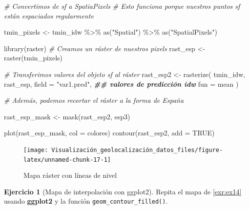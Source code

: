 \documentclass[
]{book}
\newenvironment{Shaded}{\begin{snugshade}}{\end{snugshade}}
\newcommand{\AttributeTok}[1]{\textcolor[rgb]{0.77,0.63,0.00}{#1}}
\newcommand{\CommentTok}[1]{\textcolor[rgb]{0.56,0.35,0.01}{\textit{#1}}}
\newcommand{\ConstantTok}[1]{\textcolor[rgb]{0.00,0.00,0.00}{#1}}
\newcommand{\DocumentationTok}[1]{\textcolor[rgb]{0.56,0.35,0.01}{\textbf{\textit{#1}}}}
\newcommand{\FunctionTok}[1]{\textcolor[rgb]{0.00,0.00,0.00}{#1}}
\newcommand{\NormalTok}[1]{#1}
\newcommand{\OtherTok}[1]{\textcolor[rgb]{0.56,0.35,0.01}{#1}}
\newcommand{\SpecialCharTok}[1]{\textcolor[rgb]{0.00,0.00,0.00}{#1}}
\newcommand{\StringTok}[1]{\textcolor[rgb]{0.31,0.60,0.02}{#1}}
\theoremstyle{definition}
\theoremstyle{definition}
\theoremstyle{definition}
\newtheorem{exercise}{Ejercicio}[chapter]
\theoremstyle{definition}
\theoremstyle{remark}
\begin{document}
\begin{Shaded}
\begin{Highlighting}[]
\CommentTok{\# Convertimos de sf a SpatiaPixels}
\CommentTok{\# Esto funciona porque nuestros puntos sf están espaciados regularmente}

\NormalTok{tmin\_pixels }\OtherTok{\textless{}{-}}\NormalTok{ tmin\_idw }\SpecialCharTok{\%\textgreater{}\%}
  \FunctionTok{as}\NormalTok{(}\StringTok{"Spatial"}\NormalTok{) }\SpecialCharTok{\%\textgreater{}\%}
  \FunctionTok{as}\NormalTok{(}\StringTok{"SpatialPixels"}\NormalTok{)}


\FunctionTok{library}\NormalTok{(raster)}
\CommentTok{\# Creamos un ráster de nuestros pixels}
\NormalTok{rast\_esp }\OtherTok{\textless{}{-}} \FunctionTok{raster}\NormalTok{(tmin\_pixels)}

\CommentTok{\# Transferimos valores del objeto sf al ráster}
\NormalTok{rast\_esp2 }\OtherTok{\textless{}{-}} \FunctionTok{rasterize}\NormalTok{(}
\NormalTok{  tmin\_idw,}
\NormalTok{  rast\_esp,}
  \AttributeTok{field =} \StringTok{"var1.pred"}\NormalTok{, }\DocumentationTok{\#\# valores de predicción idw}
  \AttributeTok{fun =}\NormalTok{ mean}
\NormalTok{)}

\CommentTok{\# Además, podemos recortar el ráster a la forma de España}

\NormalTok{rast\_esp\_mask }\OtherTok{\textless{}{-}} \FunctionTok{mask}\NormalTok{(rast\_esp2, esp3)}

\FunctionTok{plot}\NormalTok{(rast\_esp\_mask, }\AttributeTok{col =}\NormalTok{ colores)}
\FunctionTok{contour}\NormalTok{(rast\_esp2, }\AttributeTok{add =} \ConstantTok{TRUE}\NormalTok{)}
\end{Highlighting}
\end{Shaded}

\begin{figure}

{\centering \texttt{[image: Visualización\_geolocalización\_datos\_files/figure-latex/unnamed-chunk-17-1]} 

}

\caption{Mapa ráster con líneas de nivel}\label{fig:unnamed-chunk-17}
\end{figure}

\begin{exercise}[Mapa de interpolación con ggplot2]
\protect\hypertarget{exr:ex15}{}\label{exr:ex15}Repita el mapa de \ref{exr:ex14} usando \textbf{ggplot2} y la función
\texttt{geom\_contour\_filled()}.
\end{exercise}
\end{document}
